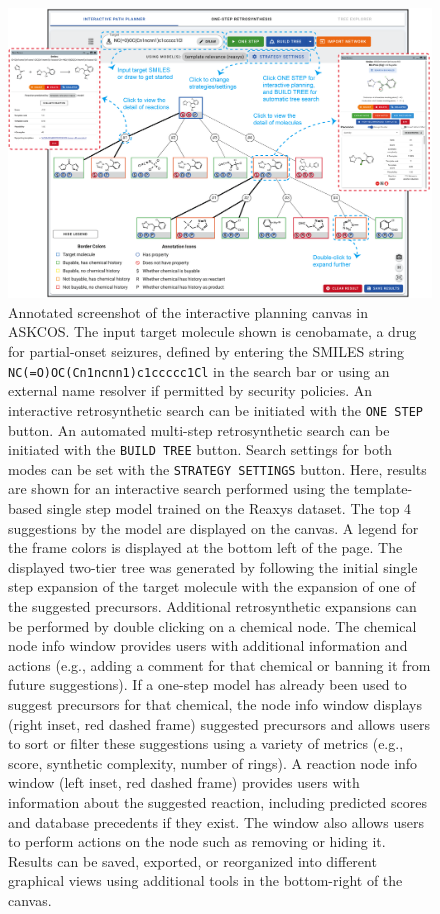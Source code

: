 \documentclass[pdflatex,sn-mathphys-num]{sn-jnl}%
\theoremstyle{thmstyleone}%
\theoremstyle{thmstyletwo}%
\theoremstyle{thmstylethree}%
\begin{document}
\begin{figure}[h!]
\centering
\includegraphics[width=1.0\textwidth]{media/1.IPP.png}
\caption{Annotated screenshot of the interactive planning canvas in ASKCOS. The input target molecule shown is cenobamate, a drug for partial-onset seizures, defined by entering the SMILES string \texttt{NC(=O)OC(Cn1ncnn1)c1ccccc1Cl} in the search bar or using an external name resolver if permitted by security policies. An interactive retrosynthetic search can be initiated with the \texttt{ONE STEP} button. An automated multi-step retrosynthetic search can be initiated with the \texttt{BUILD TREE} button. Search settings for both modes can be set with the \texttt{STRATEGY SETTINGS} button. Here, results are shown for an interactive search performed using the template-based single step model trained on the Reaxys dataset. The top 4 suggestions by the model are displayed on the canvas. A legend for the frame colors is displayed at the bottom left of the page. The displayed two-tier tree was generated by following the initial single step expansion of the target molecule with the expansion of one of the suggested precursors. Additional retrosynthetic expansions can be performed by double clicking on a chemical node. The chemical node info window provides users with additional information and actions (e.g., adding a comment for that chemical or banning it from future suggestions). If a one-step model has already been used to suggest precursors for that chemical, the node info window displays (right inset, red dashed frame) suggested precursors and allows users to sort or filter these suggestions using a variety of metrics (e.g., score, synthetic complexity, number of rings). A reaction node info window (left inset, red dashed frame)  provides users with information about the suggested reaction, including predicted scores and database precedents if they exist. The window also allows users to perform actions on the node such as removing or hiding it. Results can be saved, exported, or reorganized into different graphical views using additional tools in the bottom-right of the canvas.}\label{fig_ipp}
\end{figure}
\end{document}
